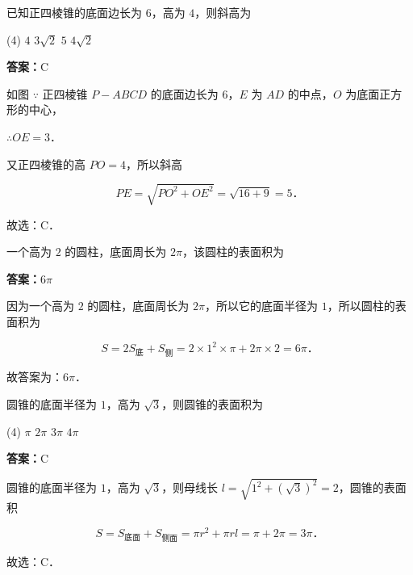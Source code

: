\vspace{2em}

\begin{example}[\bkstar{2}{5}]
已知正四棱锥的底面边长为 $6$，高为 $4$，则斜高为
\begin{tasks}(4)
    \task $4$
    \task $3\sqrt{2}$
    \task $5$
    \task $4\sqrt{2}$
\end{tasks}
\end{example}
\begin{solution}
\textbf{答案：}C

如图
$\because$ 正四棱锥 $P-ABCD$ 的底面边长为 $6$，$E$ 为 $AD$ 的中点，$O$ 为底面正方形的中心，

$\therefore OE=3$．

又正四棱锥的高 $PO=4$，所以斜高

$$
PE=\sqrt{PO^2+OE^2}=\sqrt{16+9}=5．
$$

故选：C．
\end{solution}

\vspace{2em}


\begin{example}[\bkstar{2}{5}]
一个高为 $2$ 的圆柱，底面周长为 $2\pi$，该圆柱的表面积为
\end{example}
\begin{solution}
\textbf{答案：}$6\pi$

因为一个高为 $2$ 的圆柱，底面周长为 $2\pi$，所以它的底面半径为 $1$，所以圆柱的表面积为

$$
S=2S_{\text{底}}+S_{\text{侧}}=2\times 1^2\times\pi+2\pi\times 2=6\pi．
$$

故答案为：$6\pi$．
\end{solution}

\vspace{2em}

\begin{example}[\bkstar{2}{5}]
圆锥的底面半径为 $1$，高为 $\sqrt{3}$，则圆锥的表面积为
\begin{tasks}(4)
    \task $\pi$
    \task $2\pi$
    \task $3\pi$
    \task $4\pi$
\end{tasks}
\end{example}
\begin{solution}
\textbf{答案：}C

圆锥的底面半径为 $1$，高为 $\sqrt{3}$，则母线长 $l=\sqrt{1^2+\left(\sqrt{3}\right)^2}=2$，圆锥的表面积

$$
S=S_{\text{底面}}+S_{\text{侧面}}=\pi r^2+\pi rl=\pi+2\pi=3\pi．
$$

故选：C．
\end{solution}


